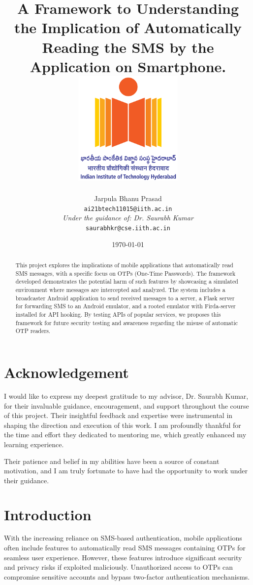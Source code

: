 \documentclass[a4paper,12pt]{article}
\title{
    A Framework to Understanding the Implication of Automatically Reading the SMS by the Application on Smartphone.
    \vfill
    \includegraphics[width=0.4\textwidth]{../images/iith_logo.png}
    \vfill
    }
\author{Jarpula Bhanu Prasad \\ 
\texttt{ai21btech11015@iith.ac.in} \\ 
\textit{Under the guidance of: Dr. Saurabh Kumar} \\ 
\texttt{saurabhkr@cse.iith.ac.in}}
\date{\today}
\begin{document}
\maketitle
\pagebreak

\begin{abstract}
    This project explores the implications of mobile applications that automatically read SMS messages, with a specific focus on OTPs (One-Time Passwords). The framework developed demonstrates the potential harm of such features by showcasing a simulated environment where messages are intercepted and analyzed. The system includes a broadcaster Android application to send received messages to a server, a Flask server for forwarding SMS to an Android emulator, and a rooted emulator with Firda-server installed for API hooking. By testing APIs of popular services, we proposes this framework for future security testing and awareness regarding the misuse of automatic OTP readers.
\end{abstract}

\vfill

\tableofcontents

\vfill

\section*{Acknowledgement}
I would like to express my deepest gratitude to my advisor, Dr. Saurabh Kumar, for their invaluable guidance, encouragement, and support throughout the course of this project. Their insightful feedback and expertise were instrumental in shaping the direction and execution of this work. I am profoundly thankful for the time and effort they dedicated to mentoring me, which greatly enhanced my learning experience.

Their patience and belief in my abilities have been a source of constant motivation, and I am truly fortunate to have had the opportunity to work under their guidance.
\pagebreak

\section{Introduction}
With the increasing reliance on SMS-based authentication, mobile applications often include features to automatically read SMS messages containing OTPs for seamless user experience. However, these features introduce significant security and privacy risks if exploited maliciously. Unauthorized access to OTPs can compromise sensitive accounts and bypass two-factor authentication mechanisms.
\end{document}
